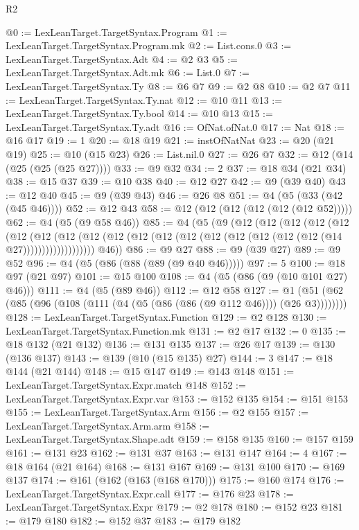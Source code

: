\begin{lexlean}{R2}
\begin{coremodule}
@0 := LexLeanTarget.TargetSyntax.Program
@1 := LexLeanTarget.TargetSyntax.Program.mk
@2 := List.cons.{0}
@3 := LexLeanTarget.TargetSyntax.Adt
@4 := @2 @3
@5 := LexLeanTarget.TargetSyntax.Adt.mk
@6 := List.{0}
@7 := LexLeanTarget.TargetSyntax.Ty
@8 := @6 @7
@9 := @2 @8
@10 := @2 @7
@11 := LexLeanTarget.TargetSyntax.Ty.nat
@12 := @10 @11
@13 := LexLeanTarget.TargetSyntax.Ty.bool
@14 := @10 @13
@15 := LexLeanTarget.TargetSyntax.Ty.adt
@16 := OfNat.ofNat.{0}
@17 := Nat
@18 := @16 @17
@19 := 1
@20 := @18 @19
@21 := instOfNatNat
@23 := @20 (@21 @19)
@25 := @10 (@15 @23)
@26 := List.nil.{0}
@27 := @26 @7
@32 := @12 (@14 (@25 (@25 (@25 @27))))
@33 := @9 @32
@34 := 2
@37 := @18 @34 (@21 @34)
@38 := @15 @37
@39 := @10 @38
@40 := @12 @27
@42 := @9 (@39 @40)
@43 := @12 @40
@45 := @9 (@39 @43)
@46 := @26 @8
@51 := @4 (@5 (@33 (@42 (@45 @46))))
@52 := @12 @43
@58 := @12 (@12 (@12 (@12 (@12 (@12 @52)))))
@62 := @4 (@5 (@9 @58 @46))
@85 := @4
    (@5
      (@9
        (@12
          (@12
            (@12
              (@12
                (@12
                  (@12
                    (@12
                      (@12
                        (@12
                          (@12 (@12 (@12 (@12 (@12 (@12 (@12 (@12 (@12 (@14 @27)))))))))))))))))))
        @46))
@86 := @9 @27
@88 := @9 (@39 @27)
@89 := @9 @52
@96 := @4 (@5 (@86 (@88 (@89 (@9 @40 @46)))))
@97 := 5
@100 := @18 @97 (@21 @97)
@101 := @15 @100
@108 := @4 (@5 (@86 (@9 (@10 @101 @27) @46)))
@111 := @4 (@5 (@89 @46))
@112 := @12 @58
@127 := @1 (@51 (@62 (@85 (@96 (@108 (@111 (@4 (@5 (@86 (@86 (@9 @112 @46)))) (@26 @3))))))))
@128 := LexLeanTarget.TargetSyntax.Function
@129 := @2 @128
@130 := LexLeanTarget.TargetSyntax.Function.mk
@131 := @2 @17
@132 := 0
@135 := @18 @132 (@21 @132)
@136 := @131 @135
@137 := @26 @17
@139 := @130 (@136 @137)
@143 := @139 (@10 (@15 @135) @27)
@144 := 3
@147 := @18 @144 (@21 @144)
@148 := @15 @147
@149 := @143 @148
@151 := LexLeanTarget.TargetSyntax.Expr.match @148
@152 := LexLeanTarget.TargetSyntax.Expr.var
@153 := @152 @135
@154 := @151 @153
@155 := LexLeanTarget.TargetSyntax.Arm
@156 := @2 @155
@157 := LexLeanTarget.TargetSyntax.Arm.arm
@158 := LexLeanTarget.TargetSyntax.Shape.adt
@159 := @158 @135
@160 := @157 @159
@161 := @131 @23
@162 := @131 @37
@163 := @131 @147
@164 := 4
@167 := @18 @164 (@21 @164)
@168 := @131 @167
@169 := @131 @100
@170 := @169 @137
@174 := @161 (@162 (@163 (@168 @170)))
@175 := @160 @174
@176 := LexLeanTarget.TargetSyntax.Expr.call
@177 := @176 @23
@178 := LexLeanTarget.TargetSyntax.Expr
@179 := @2 @178
@180 := @152 @23
@181 := @179 @180
@182 := @152 @37
@183 := @179 @182

\end{coremodule}
\end{lexlean}
